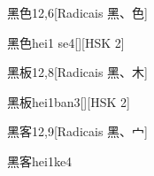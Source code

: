 \begin{entry}{黑色}{12,6}[Radicais ⿊、⾊]
  \begin{phonetics}{黑色}{hei1 se4}[][HSK 2]
  \end{phonetics}
\end{entry}

\begin{entry}{黑板}{12,8}[Radicais ⿊、⽊]
  \begin{phonetics}{黑板}{hei1ban3}[][HSK 2]
  \end{phonetics}
\end{entry}

\begin{entry}{黑客}{12,9}[Radicais ⿊、⼧]
  \begin{phonetics}{黑客}{hei1ke4}
  \end{phonetics}
\end{entry}


